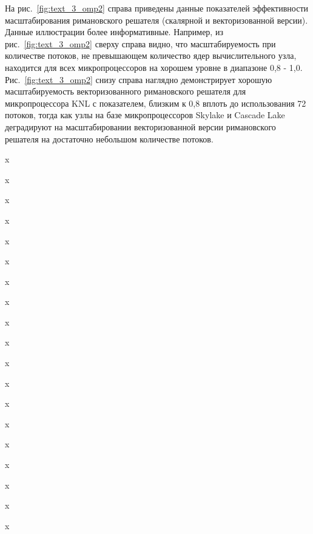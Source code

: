 \documentclass[a4paper,14pt]{extarticle}                     %
\theoremstyle{plain}                                         %
\begin{document}
На рис.~\ref{fig:text_3_omp2} справа приведены данные показателей эффективности масштабирования римановского решателя (скалярной и векторизованной версии).
Данные иллюстрации более информативные.
Например, из рис.~\ref{fig:text_3_omp2} сверху справа видно, что масштабируемость при количестве потоков, не превышающем количество ядер вычислительного узла, находится для всех микропроцессоров на хорошем уровне в диапазоне 0,8 - 1,0.
Рис.~\ref{fig:text_3_omp2} снизу справа наглядно демонстрирует хорошую масштабируемость векторизованного римановского решателя для микропроцессора KNL с показателем, близким к 0,8 вплоть до использования 72 потоков, тогда как узлы на базе микропроцессоров Skylake и Cascade Lake деградируют на масштабировании векторизованной версии римановского решателя на достаточно небольшом количестве потоков.

x

x

x

x

x

x

x

x

x

x

x

x

x

x

x

x

x

x

x

\end{document}
